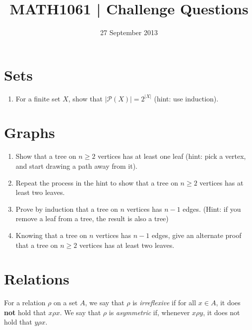 \documentclass[a4paper,12pt]{article}
\begin{document}
\pagestyle{myheadings}

\title{MATH1061 | Challenge Questions}
\date{27 September 2013}
\maketitle

\section{Sets}

\begin{enumerate}
\item For a finite set $X$, show that $|\mathcal{P}(X)| = 2^{|X|}$ (hint: use
induction).
\end{enumerate}

\section{Graphs}

\begin{enumerate}
\item Show that a tree on $n \geq 2$ vertices has at least one leaf
(hint: pick a vertex, and start drawing a path away from it).
\item Repeat the process in the hint to show that a tree on $n \geq 2$ vertices
has at least two leaves.
\item Prove by induction that a tree on $n$ vertices has $n-1$ edges.
(Hint: if you remove a leaf from a tree, the result is also a tree)
\item Knowing that a tree on $n$ vertices has $n-1$ edges, give an alternate
proof that a tree on $n \geq 2$ vertices has at least two leaves.
\end{enumerate}

\section{Relations}

For a relation $\rho$ on a set $A$, we say that $\rho$ is {\em irreflexive} if
for all $x \in A$, it does {\bf not} hold that $x \rho x$.
We say that $\rho$ is {\em asymmetric} if, whenever $x \rho y$, it does not
hold that $y \rho x$.
\end{document}
